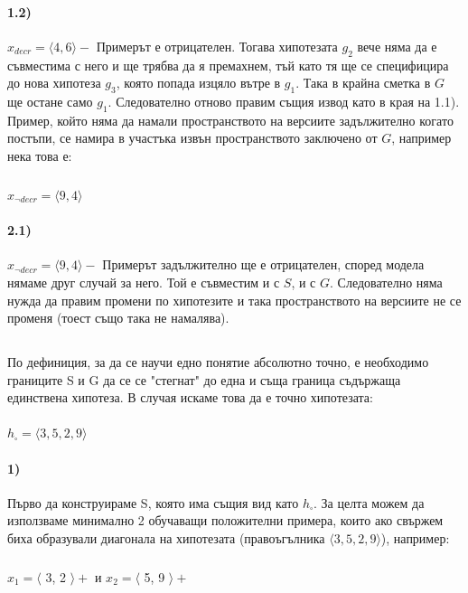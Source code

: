 \documentclass[12pt]{article}
\begin{document}
	\paragraph{1.2)} $x_{decr} = \langle 4,6 \rangle -$ \newline\newline
	Примерът е отрицателен. Тогава хипотезата $g_{2}$ вече няма да е съвместима с него и ще трябва да я премахнем, тъй като тя ще се специфицира до нова хипотеза $g_{3}$, която попада изцяло вътре в $g_{1}$. Така в крайна сметка в $G$ ще остане само $g_{1}$. Следователно отново правим същия извод като в края на 1.1).
	\newline
	\newline
	\newline
	Пример, който няма да намали пространството на версиите задължително когато постъпи, се намира в участъка извън пространството заключено от $G$, например нека това е:
	\subparagraph{}
	$x_{\neg decr} = \langle 9,4 \rangle$
	
	\paragraph{2.1)} $x_{\neg decr} = \langle 9,4 \rangle -$ \newline\newline
	Примерът задължително ще е отрицателен, според модела нямаме друг случай за него. Той е съвместим и с $S$, и с $G$. Следователно няма нужда да правим промени по хипотезите и така пространството на версиите не се променя (тоест също така не намалява).
	
	
	\subsection{}
	
	По дефиниция, за да се научи едно понятие абсолютно точно, е необходимо границите S и G да се се "стегнат" до една и съща граница съдържаща единствена хипотеза.\newline\newline
	В случая искаме това да е точно хипотезата:
	\paragraph{}
	$h_{\square} = \langle 3, 5, 2, 9 \rangle$\newline\newline
	
	\paragraph{1)}
	Първо да конструираме S, която има същия вид като $h_{\square}$.\newline\newline
	За целта можем да използваме минимално 2 обучаващи положителни примера, които ако свържем биха образували диагонала на хипотезата (правоъгълника $\langle 3, 5, 2, 9 \rangle$), например:
		\subparagraph{}
		$x_{1} = \langle $ 3, 2 $\rangle  +$ и $x_{2} = \langle $ 5, 9 $\rangle  +$
\end{document}
